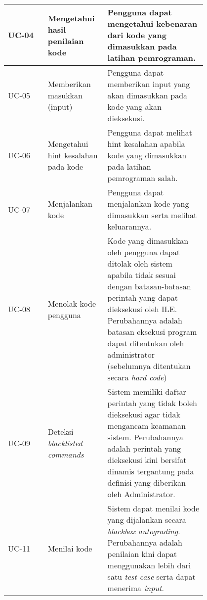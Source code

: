 \begin{longtable}[c]{|l|>{\setlength{\baselineskip}{0.75\baselineskip}}p{0.3\linewidth}|>{\setlength{\baselineskip}{0.75\baselineskip}}p{0.5\linewidth}|}
  UC-04       & Mengetahui hasil penilaian kode                & Pengguna dapat mengetahui kebenaran dari kode yang dimasukkan pada latihan pemrograman.                                                                                                                                                                                              \\ \hline
  UC-05       & Memberikan masukkan (input)                    & Pengguna dapat memberikan input yang akan dimasukkan pada kode yang akan dieksekusi.                                                                                                                                                                                                 \\ \hline
  UC-06       & Mengetahui hint kesalahan pada kode            & Pengguna dapat melihat hint kesalahan apabila kode yang dimasukkan pada latihan pemrograman salah.                                                                                                                                                                                   \\ \hline
  UC-07       & Menjalankan kode                               & Pengguna dapat menjalankan kode yang dimasukkan serta melihat keluarannya.                                                                                                                                                                                                           \\ \hline
  UC-08       & Menolak kode pengguna                          & Kode yang dimasukkan oleh pengguna dapat ditolak oleh sistem apabila tidak sesuai dengan batasan-batasan perintah yang dapat dieksekusi oleh ILE. Perubahannya adalah batasan eksekusi program dapat ditentukan oleh administrator (sebelumnya ditentukan secara \textit{hard code}) \\ \hline
  UC-09       & Deteksi \textit{blacklisted commands}          & Sistem memiliki daftar perintah yang tidak boleh dieksekusi agar tidak mengancam keamanan sistem. Perubahannya adalah perintah yang dieksekusi kini bersifat dinamis tergantung pada definisi yang diberikan oleh Administrator.                                                     \\ \hline
  UC-11       & Menilai kode                                   & Sistem dapat menilai kode yang dijalankan secara \textit{blackbox autograding}. Perubahannya adalah penilaian kini dapat menggunakan lebih dari satu \textit{test case} serta dapat menerima \textit{input}.                                                                         \\ \hline

\end{longtable}
